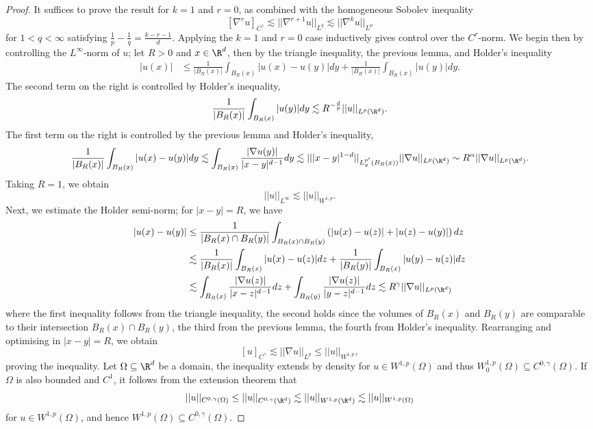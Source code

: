 \documentclass[reqno]{amsart}
\theoremstyle{definition}
\theoremstyle{remark}
\begin{document}
\begin{proof}
	It suffices to prove the result for $k = 1$ and $r = 0$, as combined with the homogeneous Sobolev inequality 
		\[ [\nabla^r u]_{C^\gamma} \lesssim ||\nabla^{r + 1} u||_{L^q} \lesssim ||\nabla^k u||_{L^p} \]
	for $1 < q < \infty$ satisfying $\tfrac{1}{p} - \tfrac{1}{q}= \tfrac{k - r - 1}{d}$. Applying the $k = 1$ and $r = 0$ case inductively gives control over the $C^r$-norm. We begin then by controlling the $L^\infty$-norm of $u$; let $R > 0$ and $x \in \R^d$, then by the triangle inequality, the previous lemma, and Holder's inequality
		\begin{align*}
			 |u(x)|
			 	&\leq \frac{1}{|B_R (x)|} \int_{B_R (x)} |u(x) - u(y)| dy + \frac{1}{|B_R (x)|} \int_{B_R (x)} |u(y)| dy .
		\end{align*}	 	
	The second term on the right is controlled by Holder's inequality,
		\[ \frac{1}{|B_R (x)|} \int_{B_R (x)} |u(y)| dy \lesssim R^{- \frac{d}{p}} ||u||_{L^p (\R^d)} .\]	
	The first term on the right is controlled by the previous lemma and Holder's inequality, 
		\begin{align*}
			\frac{1}{|B_R (x)|} \int_{B_R (x)} |u(x) - u(y)| dy \lesssim \int_{B_R (x)} \frac{|\nabla u (y)|}{|x - y|^{d  - 1}} dy \lesssim || |x - y|^{1 - d} ||_{L^{p'}_y (B_R (x))} ||\nabla u||_{L^p (\R^d)} \sim R^\alpha ||\nabla u||_{L^p (\R^d)}.
		\end{align*}
	Taking $R = 1$, we obtain 
		\[ ||u||_{L^\infty} \lesssim ||u||_{W^{1, p}}.  \]
	Next, we estimate the Holder semi-norm; for $|x - y| = R$, we have
		\begin{align*}
			 |u(x) -u(y)| 
			 	&\leq \frac{1}{|B_R (x) \cap B_R (y)|} \int_{B_R (x) \cap B_R (y)} \left( |u(x) - u(z)| + |u(z) - u(y)| \right) dz \\
			 	&\lesssim \frac{1}{|B_R (x)|} \int_{B_R (x)} |u(x) - u(z)| dz + \frac{1}{|B_R (y)|} \int_{B_R (x)} |u(y) - u(z)| dz \\
			 	&\lesssim \int_{B_R (x)} \frac{|\nabla u(z)|}{|x - z|^{d - 1}} dz + \int_{B_R (y)} \frac{|\nabla u(z)|}{|y - z|^{d - 1}} dz \lesssim R^\gamma ||\nabla u||_{L^p (\R^d)}
		\end{align*}	 	
	where the first inequality follows from the triangle inequality, the second holds since the volumes of $B_R (x)$ and $B_R(y)$ are comparable to their intersection $B_R (x) \cap B_R (y)$, the third from the previous lemma, the fourth from Holder's inequality. Rearranging and optimising in $|x - y| = R$, we obtain
		\[ [u]_{C^\gamma} \lesssim ||\nabla u||_{L^p} \leq ||u||_{W^{1, p}}, \]
	proving the inequality. Let $\Omega \subseteq \R^d$ be a domain, the inequality extends by density for $u \in W^{1, p} (\Omega)$ and thus $W^{1, p}_0 (\Omega) \subseteq C^{0, \gamma} (\Omega)$. If $\Omega$ is also bounded and $C^1$, it follows from the extension theorem that
		\[ ||u||_{C^{0, \gamma} (\Omega)} \leq ||u||_{C^{0, \gamma} (\R^d)} \lesssim ||u||_{W^{1, p} (\R^d)} \lesssim ||u||_{W^{1,p} (\Omega)} \]
	for $u \in W^{1, p} (\Omega)$, and hence $W^{1, p} (\Omega) \subseteq C^{0, \gamma} (\Omega)$. 	
\end{proof}
\end{document}
